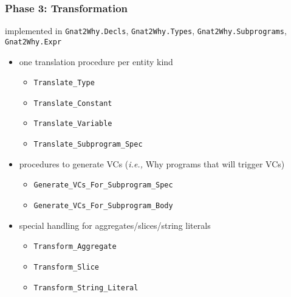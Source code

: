 \documentclass{beamer}
\newcommand{\vs}{\vspace{0.5cm}}
\newcommand{\ie}{\textit{i.e.,}\xspace}
\newenvironment{specialframe}{%
  \begin{frame}[fragile,environment=specialframe]}{\end{frame}}
\begin{document}
\begin{specialframe}\frametitle{Phase 3: Transformation}
  implemented in \verb|Gnat2Why.Decls|, \verb|Gnat2Why.Types|,
  \verb|Gnat2Why.Subprograms|, \verb|Gnat2Why.Expr|

  \vs

      \begin{itemize}
      \item one translation procedure per entity kind
            \begin{itemize}
                  \item \verb|Translate_Type|
                  \item \verb|Translate_Constant|
                  \item \verb|Translate_Variable|
                  \item \verb|Translate_Subprogram_Spec|
            \end{itemize}
\vs
         \item procedures to generate VCs (\ie Why programs that
            will trigger VCs)
            \begin{itemize}
               \item \verb|Generate_VCs_For_Subprogram_Spec|
               \item \verb|Generate_VCs_For_Subprogram_Body|
            \end{itemize}
\vs
          \item special handling for aggregates/slices/string literals
            \begin{itemize}
            \item \verb|Transform_Aggregate|
            \item \verb|Transform_Slice|
            \item \verb|Transform_String_Literal|
            \end{itemize}
      \end{itemize}
\end{specialframe}
\end{document}
